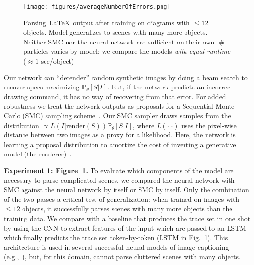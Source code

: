 \documentclass{article}
\newcommand{\probability}{\mathds{P}} %
\theoremstyle{definition}
\begin{document}
\begin{figure}
  \vspace{-0.25cm}
  \centering
      \texttt{[image: figures/averageNumberOfErrors.png]}
      \caption{Parsing~\LaTeX~output after training on diagrams with $\leq 12$ objects. Model generalizes to scenes with many more objects. Neither SMC nor the neural network are sufficient on their own. \# particles varies by model: we compare the models \emph{with equal runtime} ($\approx 1$ sec/object)}\label{syntheticResults}%
\end{figure}
Our network can ``derender'' random synthetic images
by doing a beam search to
recover  specs maximizing $\probability_\theta[S|I]$. %
 But, if the network predicts an incorrect
drawing command, it has no way of recovering from that error.  
For added robustness %
we treat the
 network outputs as proposals for a Sequential Monte Carlo (SMC) sampling scheme~\citep{SMCBook}.
Our SMC sampler draws samples
from the distribution $\propto L(I|\text{render}(S))
\probability_\theta[S|I]$, where $L(\cdot | \cdot)$
uses the pixel-wise distance between two images as a proxy for a
likelihood.
Here, the network is learning a proposal distribution to amortize the cost of inverting a generative model (the renderer)~\citep{paige2016inference}.


\textbf{Experiment 1: Figure~\ref{syntheticResults}.}
  To evaluate which components of the model are necessary to parse complicated scenes,
  we compared  the neural network
  with SMC against the neural network by
itself or SMC by itself.  Only the combination of the two passes a
critical test of generalization: when trained on images with $\leq 12$
objects, it successfully parses scenes with many more objects than the
training data.
We compare with a baseline that produces the trace set in one shot by
using the CNN to extract features of the input which are passed to an LSTM which finally predicts
the trace set token-by-token (LSTM in Fig.~\ref{syntheticResults}).
This architecture is used in several successful neural models of image captioning (e.g.,~\cite{vinyals2015show}),
but, for this domain, cannot parse cluttered scenes with many objects.
\end{document}
